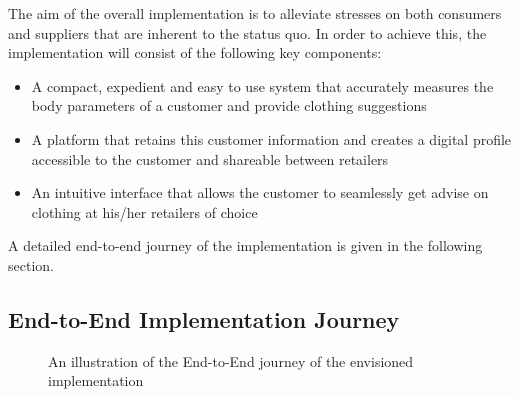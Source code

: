 The aim of the overall implementation is to alleviate stresses on both consumers and suppliers that are inherent to the status quo.  In order to achieve this, the implementation will consist of the following key components: 

\begin{itemize}
	\item A compact, expedient and easy to use system that accurately measures the body parameters of a customer and provide clothing suggestions
	\item A platform that retains this customer information and creates a digital profile accessible to the customer and shareable between retailers  
	\item An intuitive interface that allows the customer to seamlessly get advise on clothing at his/her retailers of choice	
\end{itemize} 

A detailed end-to-end journey of the implementation is given in the following section.

\subsection{End-to-End Implementation Journey}

\begin{figure}[ht]
	\centering
	{%
		\setlength{\fboxsep}{0pt}%
		\setlength{\fboxrule}{0.5pt}%
		}
	\caption{An illustration of the End-to-End journey of the envisioned implementation}
	\label{fig:endToEndImplementation}
\end{figure}


